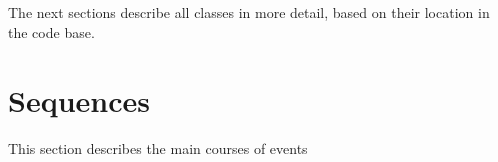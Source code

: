 The next sections describe all classes in more detail, based on their location
in the code base.












\section{Sequences}

This section describes the main courses of events







